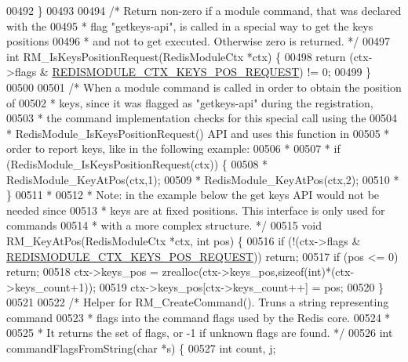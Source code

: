 \begin{DoxyCode}
{00492 \}
00493 
00494 \textcolor{comment}{/* Return non-zero if a module command, that was declared with the}
00495 \textcolor{comment}{ * flag "getkeys-api", is called in a special way to get the keys positions}
00496 \textcolor{comment}{ * and not to get executed. Otherwise zero is returned. */}
00497 \textcolor{keywordtype}{int} RM\_IsKeysPositionRequest(RedisModuleCtx *ctx) \{
00498     \textcolor{keywordflow}{return} (ctx->flags & \hyperlink{module_8c_a235c576b70301827b2d69fd909b191d9}{REDISMODULE\_CTX\_KEYS\_POS\_REQUEST}) != 0;
00499 \}
00500 
00501 \textcolor{comment}{/* When a module command is called in order to obtain the position of}
00502 \textcolor{comment}{ * keys, since it was flagged as "getkeys-api" during the registration,}
00503 \textcolor{comment}{ * the command implementation checks for this special call using the}
00504 \textcolor{comment}{ * RedisModule\_IsKeysPositionRequest() API and uses this function in}
00505 \textcolor{comment}{ * order to report keys, like in the following example:}
00506 \textcolor{comment}{ *}
00507 \textcolor{comment}{ *     if (RedisModule\_IsKeysPositionRequest(ctx)) \{}
00508 \textcolor{comment}{ *         RedisModule\_KeyAtPos(ctx,1);}
00509 \textcolor{comment}{ *         RedisModule\_KeyAtPos(ctx,2);}
00510 \textcolor{comment}{ *     \}}
00511 \textcolor{comment}{ *}
00512 \textcolor{comment}{ *  Note: in the example below the get keys API would not be needed since}
00513 \textcolor{comment}{ *  keys are at fixed positions. This interface is only used for commands}
00514 \textcolor{comment}{ *  with a more complex structure. */}
00515 \textcolor{keywordtype}{void} RM\_KeyAtPos(RedisModuleCtx *ctx, \textcolor{keywordtype}{int} pos) \{
00516     \textcolor{keywordflow}{if} (!(ctx->flags & \hyperlink{module_8c_a235c576b70301827b2d69fd909b191d9}{REDISMODULE\_CTX\_KEYS\_POS\_REQUEST})) \textcolor{keywordflow}{return};
00517     \textcolor{keywordflow}{if} (pos <= 0) \textcolor{keywordflow}{return};
00518     ctx->keys\_pos = zrealloc(ctx->keys\_pos,\textcolor{keyword}{sizeof}(\textcolor{keywordtype}{int})*(ctx->keys\_count+1));
00519     ctx->keys\_pos[ctx->keys\_count++] = pos;
00520 \}
00521 
00522 \textcolor{comment}{/* Helper for RM\_CreateCommand(). Truns a string representing command}
00523 \textcolor{comment}{ * flags into the command flags used by the Redis core.}
00524 \textcolor{comment}{ *}
00525 \textcolor{comment}{ * It returns the set of flags, or -1 if unknown flags are found. */}
00526 \textcolor{keywordtype}{int} commandFlagsFromString(\textcolor{keywordtype}{char} *s) \{
00527     \textcolor{keywordtype}{int} count, j;
}
\end{DoxyCode}
